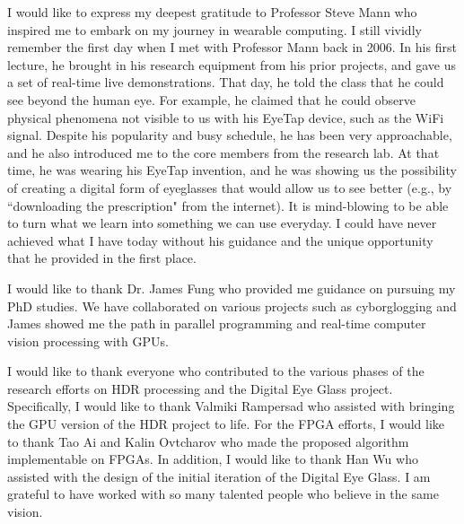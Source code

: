 I would like to express my deepest gratitude to Professor Steve Mann who inspired me to embark on my journey in wearable computing. I still vividly remember the first day when I met with Professor Mann back in 2006. In his first lecture, he brought in his research equipment from his prior projects, and gave us a set of real-time live demonstrations. That day, he told the class that he could see beyond the human eye. For example, he claimed that he could observe physical phenomena not visible to us with his EyeTap device, such as the WiFi signal. Despite his popularity and busy schedule, he has been very approachable, and he also introduced me to the core members from the research lab. At that time, he was wearing his EyeTap invention, and he was showing us the possibility of creating a digital form of eyeglasses that would allow us to see better (e.g., by ``downloading the prescription" from the internet). It is mind-blowing to be able to turn what we learn into something we can use everyday. I could have never achieved what I have today without his guidance and the unique opportunity that he provided in the first place. 

I would like to thank Dr. James Fung who provided me guidance on pursuing my PhD studies. We have collaborated on various projects such as cyborglogging and James showed me the path in parallel programming and real-time computer vision processing with GPUs. 

I would like to thank everyone who contributed to the various phases of the research efforts on HDR processing and the Digital Eye Glass project. Specifically, I would like to thank Valmiki Rampersad who assisted with bringing the GPU version of the HDR project to life. For the FPGA efforts, I would like to thank Tao Ai and Kalin Ovtcharov who made the proposed algorithm implementable on FPGAs. In addition, I would like to thank Han Wu who assisted with the design of the initial iteration of the Digital Eye Glass. I am grateful to have worked with so many talented people who believe in the same vision.
 
